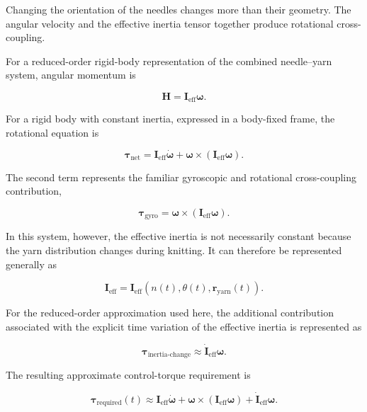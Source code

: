 \documentclass[12pt, a4paper]{article}
\begin{document}
Changing the orientation of the needles changes more than their geometry. The angular velocity and the effective inertia tensor together produce rotational cross-coupling.

For a reduced-order rigid-body representation of the combined needle--yarn system, angular momentum is

\begin{equation}
\mathbf{H}
=
\mathbf{I}_{\text{eff}}
\boldsymbol{\omega}.
\end{equation}

For a rigid body with constant inertia, expressed in a body-fixed frame, the rotational equation is

\begin{equation}
\boldsymbol{\tau}_{\text{net}}
=
\mathbf{I}_{\text{eff}}
\dot{\boldsymbol{\omega}}
+
\boldsymbol{\omega}
\times
\left(
\mathbf{I}_{\text{eff}}
\boldsymbol{\omega}
\right).
\end{equation}

The second term represents the familiar gyroscopic and rotational cross-coupling contribution,

\begin{equation}
\boldsymbol{\tau}_{\text{gyro}}
=
\boldsymbol{\omega}
\times
\left(
\mathbf{I}_{\text{eff}}
\boldsymbol{\omega}
\right).
\end{equation}

In this system, however, the effective inertia is not necessarily constant because the yarn distribution changes during knitting. It can therefore be represented generally as

\begin{equation}
\mathbf{I}_{\text{eff}}
=
\mathbf{I}_{\text{eff}}
\left(
n(t),
\theta(t),
\mathbf{r}_{\text{yarn}}(t)
\right).
\end{equation}

For the reduced-order approximation used here, the additional contribution associated with the explicit time variation of the effective inertia is represented as

\begin{equation}
\boldsymbol{\tau}_{\text{inertia-change}}
\approx
\dot{\mathbf{I}}_{\text{eff}}
\boldsymbol{\omega}.
\end{equation}

The resulting approximate control-torque requirement is

\begin{equation}
\boldsymbol{\tau}_{\text{required}}(t)
\approx
\mathbf{I}_{\text{eff}}
\dot{\boldsymbol{\omega}}
+
\boldsymbol{\omega}
\times
\left(
\mathbf{I}_{\text{eff}}
\boldsymbol{\omega}
\right)
+
\dot{\mathbf{I}}_{\text{eff}}
\boldsymbol{\omega}.
\end{equation}
\end{document}
